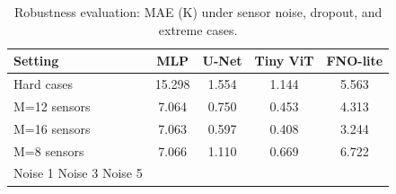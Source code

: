\begin{table}[h]
\centering
\caption{Robustness evaluation: MAE (K) under sensor noise, dropout, and extreme cases.}
\label{tab:robustness}
\begin{tabular}{lcccc}
\hline
\textbf{Setting} & \textbf{MLP} & \textbf{U-Net} & \textbf{Tiny ViT} & \textbf{FNO-lite} \\
\hline
Hard cases & 15.298 & 1.554 & 1.144 & 5.563 \\
M=12 sensors & 7.064 & 0.750 & 0.453 & 4.313 \\
M=16 sensors & 7.063 & 0.597 & 0.408 & 3.244 \\
M=8 sensors & 7.066 & 1.110 & 0.669 & 6.722 \\
Noise 1%
Noise 3%
Noise 5%
\hline
\end{tabular}
\end{table}
